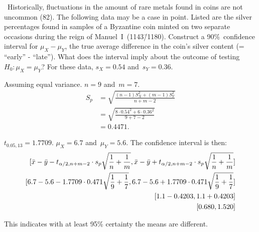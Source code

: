 \begin{problem}
  ~Historically, fluctuations in the amount of rare metals found in coins are not uncommon (82). The following data may be a case in point. Listed are the silver percentages found in samples of a Byzantine coin minted on two separate occasions during the reign of Manuel~I~(1143\=/1180). Construct a 90\%~confidence interval for ${\mu_{X} - \mu_{Y}}$, the true average difference in the coin’s silver content (= ``early'' - ``late''). What does the interval imply about the outcome of testing ${H_0: \mu_{X} = \mu_{Y}}$? For these data, ${s_{X} = 0.54}$ and~${s_{Y} = 0.36}$.
\end{problem}

\noindent
Assuming equal variance. ${n = 9}$ and~${m = 7}$.
\begin{align}
  S_{p} &= \sqrt{\frac{(n-1)S^{2}_{X} + (m-1)S^{2}_{Y}}{n + m - 2}} \\
        &= \sqrt{\frac{8 \cdot 0.54^2 + 6 \cdot 0.36^2}{9 + 7 - 2}} \\
        &= 0.4471\text{.}
\end{align}

${t_{0.05,13} = 1.7709}$.  ${\mu_{X} = 6.7}$ and~${\mu_{Y} = 5.6}$. The confidence interval is then:
\begin{align}
  \lbrack\bar{x} - \bar{y} - t_{\alpha/2,n+m-2} \cdot s_p\sqrt{\frac{1}{n} + \frac{1}{m}},\bar{x} - \bar{y} + t_{\alpha/2,n+m-2} \cdot s_p\sqrt{\frac{1}{n} + \frac{1}{m}}\rbrack \\
  \lbrack6.7 - 5.6 - 1.7709 \cdot 0.471 \sqrt{\frac{1}{9} + \frac{1}{7}}, 6.7 - 5.6+ 1.7709 \cdot 0.471 \sqrt{\frac{1}{9} + \frac{1}{7}}\rbrack \\
  \lbrack1.1 - 0.4203, 1.1 + 0.4203\rbrack \\
  \lbrack0.680, 1.520\rbrack
\end{align}

This indicates with at least 95\% certainty the means are different.
